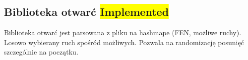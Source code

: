 \subsection{Biblioteka otwarć \colorbox{yellow}{Implemented}}
\label{subsec:biblioteka-otwarc}

{
    \color{red}
    \large Biblioteka otwarć jest parsowana z pliku na hashmape (FEN, możliwe ruchy).
Losowo wybierany ruch spośród możliwych.
Pozwala na randomizację posunięć szczególnie na początku.

}